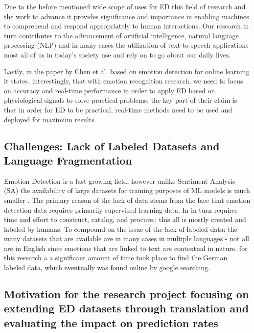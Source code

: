 \documentclass[11pt]{article}
\begin{document}
Due to the before mentioned wide scope of uses for ED this field of research and the work to advance it provides significance and importance in enabling machines to comprehend and respond appropriately to human interactions. Our research in turn contributes to the advancement of artificial intelligence, natural language processing (NLP) and in many cases the utilization of text-to-speech applications most all of us in today's society use and rely on \cite{ai-framework-detection-emotions} to go about our daily lives.

Lastly, in the paper by Chen et al.\cite{research-emotion-recognition-for-online-learning} based on emotion detection for online learning it states, interestingly, that with emotion recognition research, we need to focus on accuracy and real-time performance in order to apply ED based on physiological signals to solve practical problems; the key part of their claim is that in order for ED to be practical, real-time methods need to be used and deployed for maximum results.

\subsection{Challenges: Lack of Labeled Datasets and Language Fragmentation}
Emotion Detection is a fast growing field\cite{ACLU-ED-Data, ACLU-THE-DAWN-OF-ROBOT-SURVEILLANCE}, however unlike Sentiment Analysis (SA) the availability of large datasets for training purposes of ML models is much smaller \cite{ACLU-ED-Data, ai-framework-detection-emotions}. The primary reason of the lack of data stems from the face that emotion detection data requires primarily supervised learning data. In in turn requires time and effort to construct, catalog, and procure,; this all is mostly created and labeled by humans. To compound on the issue of the lack of labeled data; the many datasets that are available are in many cases in multiple languages - not all are in English since emotions that are linked to text are contextual in nature. for this research a a significant amount of time took place to find the German labeled data, which eventually was found online by google searching.

\subsection{Motivation for the research project focusing on extending ED datasets through translation and evaluating the impact on prediction rates}
\end{document}
